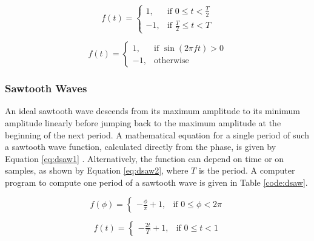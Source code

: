 \begin{multicols}{2}

  \begin{equation}
    f(t) =
    \begin{cases}
      1,& \text{if } 0 \leq t < \frac{T}{2}\\
      -1,& \text{if } \frac{T}{2} \leq t < T
    \end{cases}
    \label{eq:dsquare1}
  \end{equation}

  \begin{equation}
    f(t) =
    \begin{cases}
      1,& \text{if } \sin(2 \pi f t) > 0\\
      -1,& \text{otherwise}
    \end{cases}
    \label{eq:dsquare2}
  \end{equation}

\end{multicols}

\begin{table}
\end{table}

\subsubsection{Sawtooth Waves}

An ideal sawtooth wave descends from its maximum amplitude to its minimum amplitude linearly before jumping back to the maximum amplitude at the beginning of the next period. A mathematical equation for a single period of such a sawtooth wave function, calculated directly from the phase, is given by Equation \ref{eq:dsaw1} . Alternatively, the function can depend on time or on samples, as shown by Equation \ref{eq:dsaw2}, where $T$ is the period. A computer program to compute one period of a sawtooth wave is given in Table \ref{code:dsaw}.

\begin{multicols}{2}

  \begin{equation}
    f(\phi) =
    \begin{cases}
      -\frac{\phi}{\pi} + 1,& \text{if } 0 \leq \phi < 2 \pi
    \end{cases}
    \label{eq:dsaw1}
  \end{equation}

  \begin{equation}
    f(t) =
    \begin{cases}
      -\frac{2t}{T} + 1,& \text{if } 0 \leq t < 1
    \end{cases}
    \label{eq:dsaw2}
  \end{equation}

\end{multicols}

